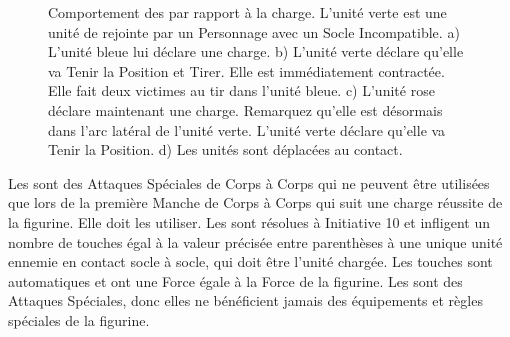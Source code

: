 \begin{figure}[!htbp]
\centering
\def\svgwidth{\textwidth}

\caption{Comportement des \skirmishers{} par rapport à la charge.\vspace*{10pt}\newline
L'unité verte est une unité de \skirmishers{} rejointe par un Personnage avec un Socle Incompatible.\vspace*{10pt}\newline
a) L'unité bleue lui déclare une charge.\newline
b) L'unité verte déclare qu'elle va Tenir la Position et Tirer. Elle est immédiatement contractée. Elle fait deux victimes au tir dans l'unité bleue.\newline
c) L'unité rose déclare maintenant une charge. Remarquez qu'elle est désormais dans l'arc latéral de l'unité verte. L'unité verte déclare qu'elle va Tenir la Position.\newline
d) Les unités sont déplacées au contact.}
\label{figure/skirmishers}
\end{figure}


Les \impacthits{} sont des Attaques Spéciales de Corps à Corps qui ne peuvent être utilisées que lors de la première Manche de Corps à Corps qui suit une charge réussite de la figurine. Elle doit les utiliser. Les \impacthits{} sont résolues à Initiative 10 et infligent un nombre de touches égal à la valeur précisée entre parenthèses à une unique unité ennemie en contact socle à socle, qui doit être l'unité chargée. Les touches sont automatiques et ont une Force égale à la Force de la figurine.  Les \impacthits{} sont des Attaques Spéciales, donc elles ne bénéficient jamais des équipements et règles spéciales de la figurine. 


